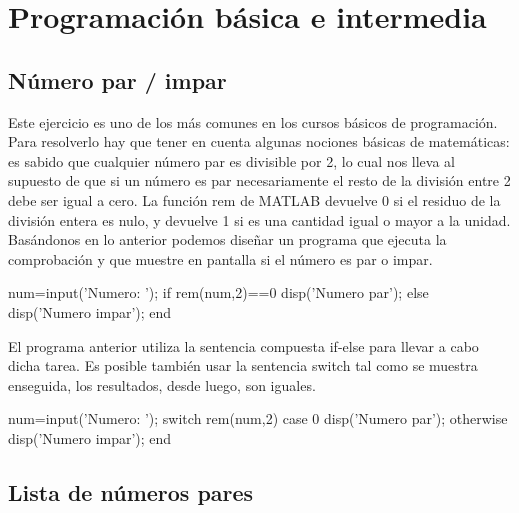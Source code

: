 \chapter{Programación básica e intermedia}

\section{Número par / impar}


\sol

Este ejercicio es uno de los más comunes en los cursos básicos de programación. 
Para resolverlo hay que tener en cuenta algunas nociones básicas de matemáticas: es 
sabido que cualquier número par es divisible por 2, lo cual nos lleva al supuesto de que 
si un número es par necesariamente el resto de la división entre 2 debe ser igual a cero. 
La función rem de MATLAB devuelve 0 si el residuo de la división entera es nulo, y devuelve 1 
si es una cantidad igual o mayor a la unidad. Basándonos en lo anterior podemos diseñar 
un programa que ejecuta la comprobación y que muestre en pantalla si el número es par o impar.

\begin{matlab}
num=input('Numero: ');
if rem(num,2)==0
    disp('Numero par');
else
    disp('Numero impar');
end
\end{matlab}

El programa anterior utiliza la sentencia compuesta if-else para llevar a cabo dicha tarea. 
Es posible también usar la sentencia switch tal como se muestra enseguida, los resultados, desde luego, son iguales.

\begin{matlab}
num=input('Numero: ');
switch rem(num,2)
    case 0
        disp('Numero par');
    otherwise
        disp('Numero impar');
end
\end{matlab}


\section{Lista de números pares}


\sol

